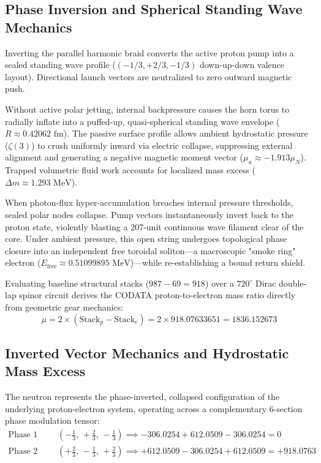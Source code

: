 \documentclass[11pt,a4paper]{article}
\begin{document}
	\subsection{Phase Inversion and Spherical Standing Wave Mechanics}
	Inverting the parallel harmonic braid converts the active proton pump into a sealed standing wave profile ($(-1/3, +2/3, -1/3)$ down-up-down valence layout). Directional launch vectors are neutralized to zero outward magnetic push.
	
	Without active polar jetting, internal backpressure causes the horn torus to radially inflate into a puffed-up, quasi-spherical standing wave envelope ($R \approx 0.42062\text{ fm}$). The passive surface profile allows ambient hydrostatic pressure ($\zeta(3)$) to crush uniformly inward via electric collapse, suppressing external alignment and generating a negative magnetic moment vector ($\mu_n \approx -1.913 \mu_N$). Trapped volumetric fluid work accounts for localized mass excess ($\Delta m \approx 1.293\text{ MeV}$).
	
	When photon-flux hyper-accumulation breaches internal pressure thresholds, sealed polar nodes collapse. Pump vectors instantaneously invert back to the proton state, violently blasting a 207-unit continuous wave filament clear of the core. Under ambient pressure, this open string undergoes topological phase closure into an independent free toroidal soliton—a macroscopic "smoke ring" electron ($E_{\text{free}} \approx 0.51099895\text{ MeV}$)—while re-establishing a bound return shield.
	
	Evaluating baseline structural stacks ($987 - 69 = 918$) over a $720^\circ$ Dirac double-lap spinor circuit derives the CODATA proton-to-electron mass ratio directly from geometric gear mechanics:
	\begin{equation}
		\mu = 2 \times (\text{Stack}_p - \text{Stack}_e) = 2 \times 918.07633651 = 1836.152673
	\end{equation}
	
	\subsection{Inverted Vector Mechanics and Hydrostatic Mass Excess}
	The neutron represents the phase-inverted, collapsed configuration of the underlying proton-electron system, operating across a complementary 6-section phase modulation tensor:
	\begin{align}
		\text{Phase 1 (Sections 1--3):} & \quad \left(-\frac{1}{3}, \, +\frac{2}{3}, \, -\frac{1}{3}\right) \implies -306.0254 + 612.0509 - 306.0254 = 0 \\
		\text{Phase 2 (Sections 4--6):} & \quad \left(+\frac{2}{3}, \, -\frac{1}{3}, \, +\frac{2}{3}\right) \implies +612.0509 - 306.0254 + 612.0509 = +918.0763
	\end{align}
	
\end{document}
